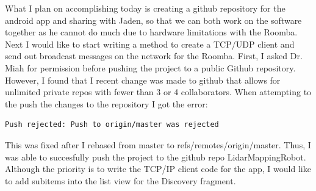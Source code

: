 \documentclass[fontsize=11pt, %
                             paper=a4, %
                             twoside, %
                             captions=tableheading,
                             index=totoc,
                             hyperref]{labbook}
\begin{document}
\begin{addmargin}[0cm]{0cm}
What I plan on accomplishing today is creating a github repository for the android app and sharing with Jaden, so that we can both work on the software together as he cannot do much due to hardware limitations with the Roomba. Next I would like to start writing a method to create a TCP/UDP client and send out broadcast messages on the network for the Roomba. First, I asked Dr. Miah for permission before pushing the project to a public Github repository. However, I found that I recent change was made to github that allows for unlimited private repos with fewer than 3 or 4 collaborators. When attempting to the push the changes to the repository I got the error:
\begin{verbatim}
Push rejected: Push to origin/master was rejected
\end{verbatim}
This was fixed after I rebased from master to refs/remotes/origin/master. Thus, I was able to succesfully push the project to the github repo LidarMappingRobot.
\smallbreak\noindent
Although the priority is to write the TCP/IP client code for the app, I would like to add subitems into the list view for the Discovery fragment. 


\end{addmargin}
\end{document}
